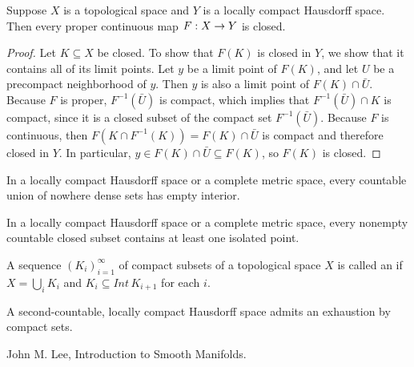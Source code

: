\documentclass[11pt,a4paper]{article}
\begin{document}
\begin{prop}
Suppose $X$ is a topological space and $Y$ is a locally compact Hausdorff space. Then every proper continuous map $F:X\rightarrow Y$ is closed.
\end{prop}

\begin{proof}
Let $K\subseteq X$ be closed. To show that $F(K)$ is closed in $Y$, we show that it contains all of its limit points. Let $y$ be a limit point of $F(K)$, and let $U$ be a precompact neighborhood of $y$. Then $y$ is also a limit point of $F(K)\cap \bar{U}$. Because $F$ is proper, $F^{-1}(\bar{U})$ is compact, which implies that $F^{-1}(\bar{U})\cap K$ is compact, since it is a closed subset of the compact set $F^{-1}(\bar{U})$. Because $F$ is continuous, then $F(K\cap F^{-1}(K)) = F(K)\cap \bar{U}$ is compact and therefore closed in $Y$. In particular, $y\in F(K)\cap\bar{U}\subseteq F(K)$, so $F(K)$ is closed.
\end{proof}

\begin{prop}
In a locally compact Hausdorff space or a complete metric space, every countable union of nowhere dense sets has empty interior.
\end{prop}

\begin{prop}
In a locally compact Hausdorff space or a complete metric space, every nonempty countable closed subset contains at least one isolated point.
\end{prop}

\begin{mydef}
A sequence $(K_i)_{i=1}^\infty$ of compact subsets of a topological space $X$ is called an  if $X = \bigcup_i K_i$ and $K_{i}\subseteq Int\,K_{i+1}$ for each $i$.
\end{mydef}

\begin{prop}
A second-countable, locally compact Hausdorff space admits an exhaustion by compact sets.
\end{prop}


\begin{thebibliography}{9}
John M. Lee, Introduction to Smooth Manifolds.



\end{thebibliography}
\end{document}
